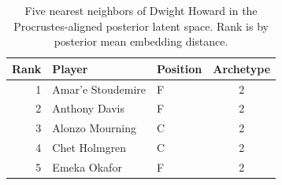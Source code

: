 \begin{table}[htbp]
  \centering\small
  \begin{tabular}{rllc}
    \toprule
    Rank & Player & Position & Archetype \\
    \midrule
    1 & Amar'e Stoudemire & F & 2 \\
    2 & Anthony Davis & F & 2 \\
    3 & Alonzo Mourning & C & 2 \\
    4 & Chet Holmgren & C & 2 \\
    5 & Emeka Okafor & F & 2 \\
    \bottomrule
  \end{tabular}
  \caption{Five nearest neighbors of Dwight Howard in the Procrustes-aligned posterior latent space. Rank is by posterior mean embedding distance.}
  \label{tab:Dwight_Howard_neighbors}
\end{table}

